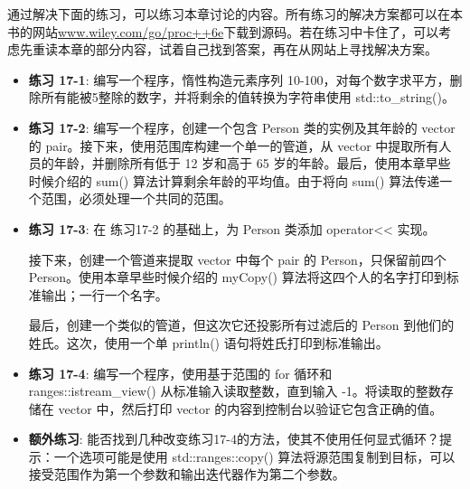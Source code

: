通过解决下面的练习，可以练习本章讨论的内容。所有练习的解决方案都可以在本书的网站\url{www.wiley.com/go/proc++6e}下载到源码。若在练习中卡住了，可以考虑先重读本章的部分内容，试着自己找到答案，再在从网站上寻找解决方案。

\begin{itemize}
\item
\textbf{练习 17-1}: 编写一个程序，惰性构造元素序列 10-100，对每个数字求平方，删除所有能被5整除的数字，并将剩余的值转换为字符串使用 std::to\_string()。

\item
\textbf{练习 17-2}: 编写一个程序，创建一个包含 Person 类的实例及其年龄的 vector 的 pair。接下来，使用范围库构建一个单一的管道，从 vector 中提取所有人员的年龄，并删除所有低于 12 岁和高于 65 岁的年龄。最后，使用本章早些时候介绍的 sum() 算法计算剩余年龄的平均值。由于将向 sum() 算法传递一个范围，必须处理一个共同的范围。

\item
\textbf{练习 17-3}: 在 练习17-2 的基础上，为 Person 类添加 operator<{}< 实现。

接下来，创建一个管道来提取 vector 中每个 pair 的 Person，只保留前四个 Person。使用本章早些时候介绍的 myCopy() 算法将这四个人的名字打印到标准输出；一行一个名字。

最后，创建一个类似的管道，但这次它还投影所有过滤后的 Person 到他们的姓氏。这次，使用一个单 println() 语句将姓氏打印到标准输出。

\item
\textbf{练习 17-4}: 编写一个程序，使用基于范围的 for 循环和 ranges::istream\_view() 从标准输入读取整数，直到输入 -1。将读取的整数存储在 vector 中，然后打印 vector 的内容到控制台以验证它包含正确的值。

\item
\textbf{额外练习}: 能否找到几种改变练习17-4的方法，使其不使用任何显式循环？提示：一个选项可能是使用 std::ranges::copy() 算法将源范围复制到目标，可以接受范围作为第一个参数和输出迭代器作为第二个参数。
\end{itemize}




